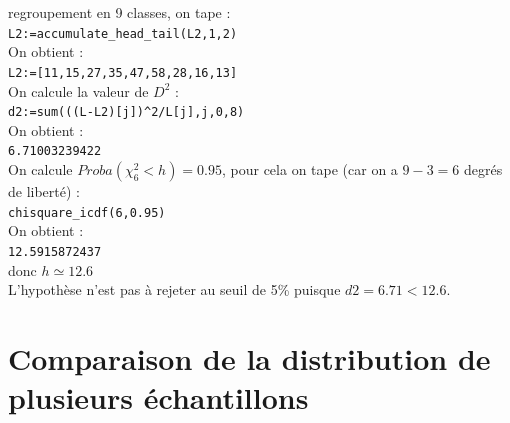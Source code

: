 \documentclass[a4paper,11pt]{book}
\begin{document}
regroupement en 9 classes,
on tape :\\
{\tt L2:=accumulate\_head\_tail(L2,1,2)}\\
On obtient :\\
{\tt L2:=[11,15,27,35,47,58,28,16,13]}\\
On calcule la valeur de $D^2$ :\\
{\tt d2:=sum(((L-L2)[j])\verb|^|2/L[j],j,0,8)}\\
On obtient :\\
{\tt 6.71003239422}\\
On calcule $Proba(\chi^2_6<h)=0.95$, pour cela on tape (car on a $9-3=6$ 
degr\'es de libert\'e) :\\
{\tt chisquare\_icdf(6,0.95)}\\
On obtient :\\
{\tt 12.5915872437}\\
donc $h \simeq 12.6$\\
L'hypoth\`ese n'est pas \`a rejeter au seuil de 5\% puisque $d2=6.71<12.6$.
\section{Comparaison de la distribution de plusieurs \'echantillons}
\end{document}
